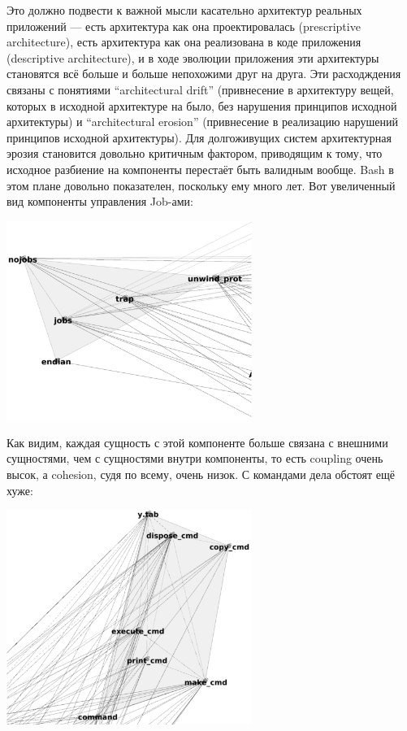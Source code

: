 \documentclass[a5paper]{article}
\begin{document}
Это должно подвести к важной мысли касательно архитектур реальных приложений --- есть архитектура как она проектировалась (prescriptive architecture), есть архитектура как она реализована в коде приложения (descriptive architecture), и в ходе эволюции приложения эти архитектуры становятся всё больше и больше непохожими друг на друга. Эти расходждения связаны с понятиями ``architectural drift'' (привнесение в архитектуру вещей, которых в исходной архитектуре на было, без нарушения принципов исходной архитектуры) и ``architectural erosion'' (привнесение в реализацию нарушений принципов исходной архитектуры). Для долгоживущих систем архитектурная эрозия становится довольно критичным фактором, приводящим к тому, что исходное разбиение на компоненты перестаёт быть валидным вообще. Bash в этом плане довольно показателен, поскольку ему много лет. Вот увеличенный вид компоненты управления Job-ами:

\begin{center}
	\includegraphics[width=0.6\textwidth]{bashJobControl.png}
\end{center}

Как видим, каждая сущность с этой компоненте больше связана с внешними сущностями, чем с сущностями внутри компоненты, то есть coupling очень высок, а cohesion, судя по всему, очень низок. С командами дела обстоят ещё хуже:

\begin{center}
	\includegraphics[width=0.6\textwidth]{bashCommands.png}
\end{center}
\end{document}
